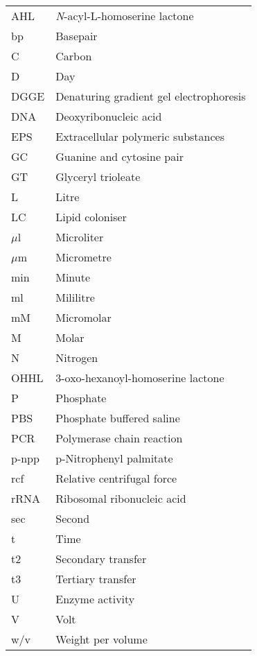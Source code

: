\documentclass[11pt]{article}
\begin{document}
\begin{table}
\begin{tabular}{  p{6.9cm} | p{6.9cm} }
\hline
AHL & \emph{N}-acyl-L-homoserine lactone \\
bp & Basepair \\
C & Carbon \\
D & Day \\
DGGE & Denaturing gradient gel electrophoresis \\
DNA & Deoxyribonucleic acid  \\
 EPS & Extracellular polymeric substances \\
 GC & Guanine and cytosine pair \\
GT & Glyceryl trioleate \\
L & Litre \\
LC & Lipid coloniser \\
$\mu$l & Microliter \\
$\mu$m & Micrometre \\
min & Minute \\
ml & Mililitre \\
mM & Micromolar \\
M & Molar \\
N & Nitrogen \\
OHHL & 3-oxo-hexanoyl-homoserine lactone \\
P  &  Phosphate \\
PBS & Phosphate buffered saline \\
PCR & Polymerase chain reaction \\
 p-npp & p-Nitrophenyl palmitate \\
rcf & Relative centrifugal force \\
rRNA & Ribosomal ribonucleic acid \\
sec & Second \\
t & Time \\
 t2 & Secondary transfer \\
t3 & Tertiary transfer \\
U & Enzyme activity \\
V & Volt \\
w/v & Weight per volume \\
  \hline
\end{tabular}
\end{table}
\end{document}
